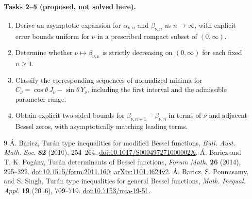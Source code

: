 \documentclass[11pt]{article}
\begin{document}
\paragraph{Tasks 2--5 (proposed, not solved here).}
\begin{enumerate}[label=Task \arabic*.,start=2,leftmargin=4.8em]
\item Derive an asymptotic expansion for $\alpha_{\nu,n}$ and
$\beta_{\nu,n}$ as $n\to\infty$, with explicit error bounds uniform for
$\nu$ in a prescribed compact subset of $(0,\infty)$.
\item Determine whether $\nu\mapsto\beta_{\nu,n}$ is strictly decreasing
on $(0,\infty)$ for each fixed $n\ge1$.
\item Classify the corresponding sequences of normalized minima for
$C_\nu=\cos\theta\,J_\nu-\sin\theta\,Y_\nu$, including the first interval
and the admissible parameter range.
\item Obtain explicit two-sided bounds for
$\beta_{\nu,n+1}-\beta_{\nu,n}$ in terms of $\nu$ and adjacent Bessel
zeros, with asymptotically matching leading terms.
\end{enumerate}

\begin{thebibliography}{9}\small
{} \'A. Baricz, Tur\'an type inequalities for modified Bessel
functions, \emph{Bull. Aust. Math. Soc.} \textbf{82} (2010), 254--264.
\href{https://doi.org/10.1017/S000497271000002X}{doi:10.1017/S000497271000002X}.
 \'A. Baricz and T. K. Pog\'any, Tur\'an determinants of
Bessel functions, \emph{Forum Math.} \textbf{26} (2014), 295--322.
\href{https://doi.org/10.1515/form.2011.160}{doi:10.1515/form.2011.160};
\href{https://arxiv.org/abs/1101.4624v2}{arXiv:1101.4624v2}.
 \'A. Baricz, S. Ponnusamy, and S. Singh, Tur\'an type
inequalities for general Bessel functions, \emph{Math. Inequal. Appl.}
\textbf{19} (2016), 709--719.
\href{https://doi.org/10.7153/mia-19-51}{doi:10.7153/mia-19-51}.
\end{thebibliography}
\end{document}
